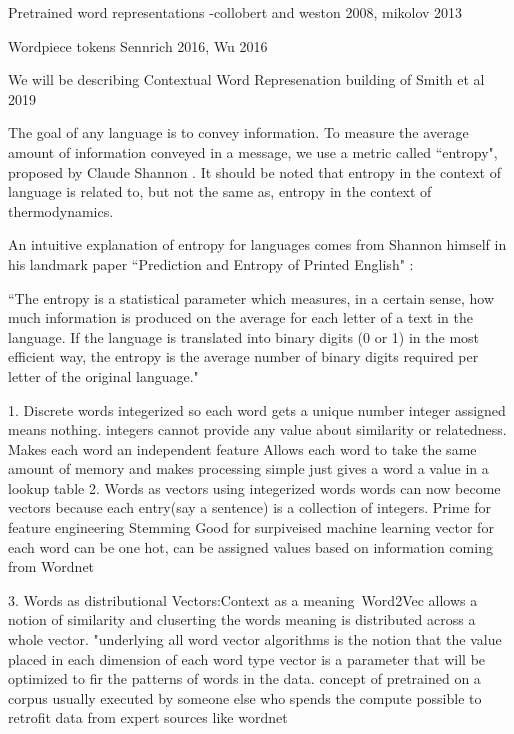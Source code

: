 \documentclass [11pt, proquest] {uwthesis}[2020/08/20]
\begin{document}
Pretrained word representations
-collobert and weston 2008, mikolov 2013

Wordpiece tokens Sennrich 2016, Wu 2016

We will be describing Contextual Word Represenation building of Smith et al 2019 \cite{Smith2019ContextualWR} 



The goal of any language is to convey information. To measure the average amount of information conveyed in a message, we use a metric called “entropy", proposed by Claude Shannon . It should be noted that entropy in the context of language is related to, but not the same as, entropy in the context of thermodynamics.


An intuitive explanation of entropy for languages comes from Shannon himself in his landmark paper “Prediction and Entropy of Printed English" :

“The entropy is a statistical parameter which measures, in a certain sense, how much information is produced on the average for each letter of a text in the language. If the language is translated into binary digits (0 or 1) in the most efficient way, the entropy is the average number of binary digits required per letter of the original language."


1. Discrete words
    integerized so each word gets a unique number
    integer assigned means nothing. integers cannot provide any value about similarity or relatedness. Makes each word an independent feature
    Allows each word to take the same amount of memory and makes processing simple
    just gives a word a value in a lookup table
2. Words as vectors
    using integerized words words can now become vectors because each entry(say a sentence) is a collection of integers. 
    Prime for feature engineering
    Stemming 
    Good for surpiveised machine learning 
    vector for each word can be one hot, can be assigned values based on information coming from Wordnet

3. Words as distributional Vectors:Context as a meaning\
    Word2Vec
    allows a notion of similarity and cluserting
    the words meaning is distributed across a whole vector. 
    "underlying all word vector algorithms is the notion that the value placed in each dimension of each word type vector is a parameter that will be optimized to fir the patterns of words in the data. 
    concept of pretrained on a corpus usually executed by someone else who spends the compute
    possible to retrofit data from expert sources like wordnet 
\end{document}
